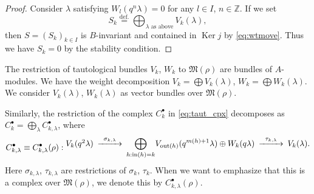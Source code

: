 \documentclass[12pt]{amsart}
\def\Bbb{\mathbb}
\def\frak{\mathfrak}
\theoremstyle{definition}
\theoremstyle{remark}
\numberwithin{equation}{subsection}
\newcommand{\defeq}{\overset{\operatorname{\scriptstyle def.}}{=}}
\newcommand{\Z}{{\Bbb Z}}
\newcommand{\Ker}{\operatorname{Ker}}
\newcommand{\vin}{\operatorname{in}} %
\newcommand{\vout}{\operatorname{out}} %
\newcommand{\M}{{\frak M}} %
\begin{document}
\begin{proof}
Consider $\lambda$ satisfying $W_l(q^{n}\lambda) = 0$ for any $l\in
I$, $n\in\Z$.
If we set
\begin{equation*}
   S_k \defeq \bigoplus_{\text{$\lambda$ as above}} V_k(\lambda),
\end{equation*}
then $S = (S_k)_{k\in I}$ is $B$-invariant and contained in
$\Ker j$ by \eqref{eq:wtmove}. Thus we have $S_k = 0$ by the stability 
condition.
\end{proof}

The restriction of tautological bundles $V_k$, $W_k$ to $\M(\rho)$
are bundles of $A$-modules. We have the weight decomposition
$V_k = \bigoplus V_k(\lambda)$, $W_k = \bigoplus W_k(\lambda)$. We
consider $V_k(\lambda)$, $W_k(\lambda)$ as vector bundles over
$\M(\rho)$.

Similarly, the restriction of the complex $C_k^\bullet$ 
in \eqref{eq:taut_cpx} decomposes as
$C_k^\bullet = \bigoplus_\lambda C_{k,\lambda}^\bullet$, where
\begin{equation}
\label{eq:taut_cpx_fixed}
C_{k,\lambda}^\bullet\equiv C_{k,\lambda}^\bullet(\rho):
\begin{CD}
  V_k(q^2\lambda)
  @>{\sigma_{k,\lambda}}>>
  \displaystyle{\bigoplus_{h:\vin(h)=k}}
     V_{\vout(h)}(q^{m(h)+1}\lambda)
    \oplus W_k(q\lambda)
  @>{\tau_{k,\lambda}}>>
  V_k(\lambda).
\end{CD}
\end{equation}
Here $\sigma_{k,\lambda}$, $\tau_{k,\lambda}$ are restrictions of
$\sigma_k$, $\tau_k$.
When we want to emphasize that this is a complex over $\M(\rho)$, we
denote this by $C_{k,\lambda}^\bullet(\rho)$.
\end{document}

